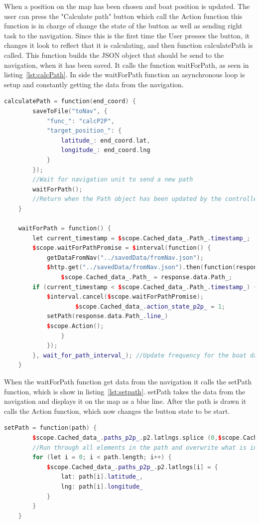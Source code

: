 When a position on the map has been chosen and boat position is updated. The user can press the "Calculate path" button which call the Action function this function is in charge of change the state of the button as well as sending right task to the navigation. Since this is the first time the User presses the button, it changes it look to reflect that it is calculating, and then function calculatePath is called. This function builds the JSON object that should be send to the navigation, when it has been saved. It calls the function waitForPath, as seen in listing~\ref{lst:calcPath}. In side the waitForPath function an asynchronous loop is setup and constantly getting the data from the navigation. 

\begin{lstlisting}[caption = {calculatePath and waitForPath in p2p.js}, captionpos=b, label={lst:calcPath}, language=C++,firstnumber=1]
calculatePath = function(end_coord) {
        saveToFile("toNav", {
            "func_": "calcP2P",
            "target_position_": {
                latitude_: end_coord.lat,
                longitude_: end_coord.lng
            }
        });
        //Wait for navigation unit to send a new path
        waitForPath();
        //Return when the Path object has been updated by the controller
    }

    waitForPath = function() {
        let current_timestamp = $scope.Cached_data_.Path_.timestamp_;
        $scope.waitForPathPromise = $interval(function() {
            getDataFromNav("../savedData/fromNav.json");
            $http.get("../savedData/fromNav.json").then(function(response) {
                $scope.Cached_data_.Path_ = response.data.Path_;
		if (current_timestamp < $scope.Cached_data_.Path_.timestamp_) {
			$interval.cancel($scope.waitForPathPromise);
                	$scope.Cached_data_.action_state_p2p_ = 1;
		 	setPath(response.data.Path_.line_)
			$scope.Action();
                }
            });
        }, wait_for_path_interval_); //Update frequency for the boat data
    }
\end{lstlisting}

When the waitForPath function get data from the navigation it calls the setPath function, which is show in listing~\ref{lst:setpath}. setPath takes the data from the navigation and displays it on the map as a blue line. After the path is drawn it calls the Action function, which now changes the button state to be start.

\begin{lstlisting}[caption = {setPath in p2p.js}, captionpos=b, label={lst:setpath}, language=C++,firstnumber=1]
setPath = function(path) {
		$scope.Cached_data_.paths_p2p_.p2.latlngs.splice (0,$scope.Cached_data_.paths_p2p_.p2.latlngs.length);
		//Run through all elements in the path and overwrite what is in the paths_ object
		for (let i = 0; i < path.length; i++) {
			$scope.Cached_data_.paths_p2p_.p2.latlngs[i] = {
				lat: path[i].latitude_,
				lng: path[i].longitude_
			}
		}
	}
\end{lstlisting}

